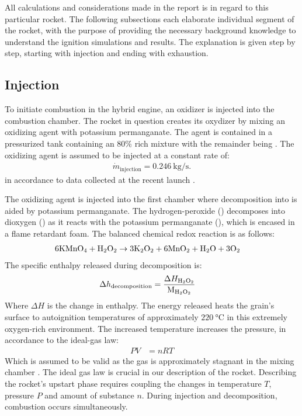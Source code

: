 	All calculations and considerations made in the report is in regard to this particular rocket. The following subsections each elaborate individual segment of the rocket, with the purpose of providing the necessary background knowledge to understand the ignition simulations and results. The explanation is given step by step, starting with injection and ending with exhaustion.


\subsection{Injection}

	To initiate combustion in the hybrid engine, an oxidizer is injected into the combustion chamber. The rocket in question creates its oxydizer by mixing an oxidizing agent with potassium permanganate. The agent is contained in a pressurized tank containing an $80 \%$  rich mixture with the remainder being . The oxidizing agent is assumed to be injected at a constant rate of:
		\begin{align}
			\dot{m}_\text{injection} = \SI{0.246}{\kg\per\s}.
		\end{align}
	in accordance to data collected at the recent launch \cite{Alex2015rapport}.

	The oxidizing agent is injected into the first chamber where decomposition into  is aided by potassium permanganate. The hydrogen-peroxide () decomposes into dioxygen () as it reacts with the potassium permanganate (), which is encased in a flame retardant foam. The balanced chemical redox reaction is as follows:
		\begin{align}
			\mathrm{6 KMnO_4 + H_2O_2} &\rightarrow \mathrm{3 K_2O_2 + 6 MnO_2 + H_2O + 3 O_2}
		\end{align}
	The specific enthalpy released during decomposition is:
		\begin{align}
			\Delta h_\text{decomposition} &= \frac{\Delta H_{\mathrm{H_2O_2}}}{\text{M}_{\mathrm{H_2O_2}}}
		\end{align}
	Where $\Delta H$ is the change in enthalpy. The energy released heats the grain's surface to autoignition temperatures of approximately $\SI{220}{\celsius}$ in this extremely oxygen-rich environment. The increased temperature increases the pressure, in accordance to the ideal-gas law:
		\begin{align}
			P V &= n R T
		\end{align}
	Which is assumed to be valid as the gas is approximately stagnant in the mixing chamber \cite{atkins}. 
	The ideal gas law is crucial in our description of the rocket. Describing the rocket's upstart phase requires coupling the changes in temperature $T$, pressure $P$ and amount of substance $n$. During injection and decomposition, combustion occurs simultaneously.

